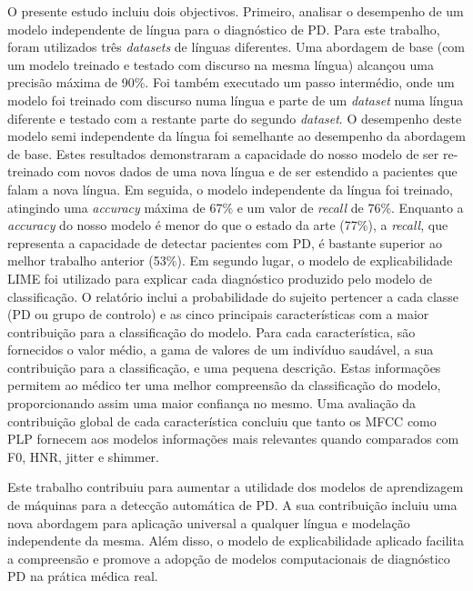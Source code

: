 O presente estudo incluiu dois objectivos. Primeiro, analisar o desempenho de um modelo independente de língua para o diagnóstico de PD. Para este trabalho, foram utilizados três \textit{datasets} de línguas diferentes. Uma abordagem de base (com um modelo treinado e testado com discurso na mesma língua) alcançou uma precisão máxima de 90\%. Foi também executado um passo intermédio, onde um modelo foi treinado com discurso numa língua e parte de um \textit{dataset} numa língua diferente e testado com a restante parte do segundo \textit{dataset}. O desempenho deste modelo semi independente da língua foi semelhante ao desempenho da abordagem de base. Estes resultados demonstraram a capacidade do nosso modelo de ser re-treinado com novos dados de uma nova língua e de ser estendido a pacientes que falam a nova língua. Em seguida, o modelo independente da língua foi treinado, atingindo uma \textit{accuracy} máxima de 67\% e um valor de \textit{recall} de 76\%. Enquanto a \textit{accuracy} do nosso modelo é menor do que o estado da arte (77\%), a \textit{recall}, que representa a capacidade de detectar pacientes com PD, é bastante superior ao melhor trabalho anterior (53\%). Em segundo lugar, o modelo de explicabilidade LIME foi utilizado para explicar cada diagnóstico produzido pelo modelo de classificação. O relatório inclui a probabilidade do sujeito pertencer a cada classe (PD ou grupo de controlo) e as cinco principais características com a maior contribuição para a classificação do modelo. Para cada característica, são fornecidos o valor médio, a gama de valores de um indivíduo saudável, a sua contribuição para a classificação, e uma pequena descrição. Estas informações permitem ao médico ter uma melhor compreensão da classificação do modelo, proporcionando assim uma maior confiança no mesmo. Uma avaliação da contribuição global de cada característica concluiu que tanto os MFCC como PLP fornecem aos modelos informações mais relevantes quando comparados com F0, HNR, jitter e shimmer.

Este trabalho contribuiu para aumentar a utilidade dos modelos de aprendizagem de máquinas para a detecção automática de PD. A sua contribuição incluiu uma nova abordagem para aplicação universal a qualquer língua e modelação independente da mesma. Além disso, o modelo de explicabilidade aplicado facilita a compreensão e promove a adopção de modelos computacionais de diagnóstico PD na prática médica real.
\newpage


